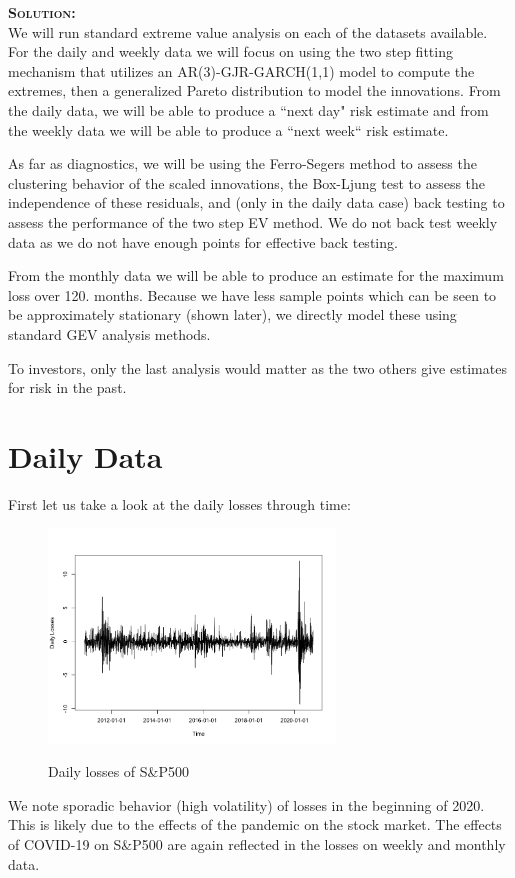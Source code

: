 \documentclass[12pt,oneside]{article}
\newenvironment{solution}
    {\textbf{\textsc{Solution:}}\\}
    {\newpage}
\begin{document}
\begin{solution}
We will run standard extreme value analysis on each of the datasets available. For the daily and weekly data we will focus on using the two step fitting mechanism that utilizes an AR(3)-GJR-GARCH(1,1) model to compute the extremes, then a generalized Pareto distribution to model the innovations. From the daily data, we will be able to produce a ``next day" risk estimate and from the weekly data we will be able to produce a ``next week`` risk estimate.


As far as diagnostics, we will be using the Ferro-Segers method to assess the clustering behavior of the scaled innovations, the Box-Ljung test to assess the independence of these residuals, and (only in the daily data case) back testing to assess the performance of the two step EV method. We do not back test weekly data as we do not have enough points for effective back testing.

From the monthly data we will be able to produce an estimate for the maximum loss over 120. months. Because we have less sample points which can be seen to be approximately stationary (shown later), we directly model these using standard GEV analysis methods.

To investors, only the last analysis would matter as the two others give estimates for risk in the past.


\section*{Daily Data}
First let us take a look at the daily losses through time:
\begin{figure}[H]
\begin{center}
{\includegraphics[width=3in]{Assignments/a4/day-data.png}}
\caption{Daily losses of S\&P500 }
\end{center}
\end{figure}
We note sporadic behavior (high volatility) of losses in the beginning of 2020. This is likely due to the effects of the pandemic on the stock market. The effects of COVID-19 on S\&P500 are again reflected in the losses on weekly and monthly data. 


\end{solution}
\end{document}
